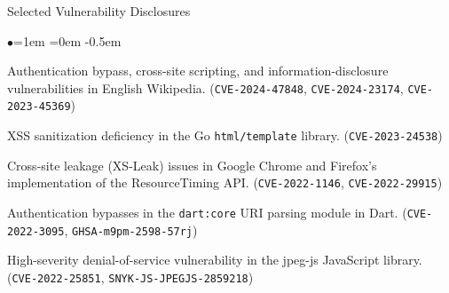 \documentclass{resume} %
\begin{document}
\begin{rSection}{Selected Vulnerability Disclosures}
\begin{list}{$\bullet$}{\leftmargin=1em \itemindent=0em}
\itemsep -0.5em
\item Authentication bypass, cross-site scripting, and information-disclosure vulnerabilities in English Wikipedia. (\texttt{CVE-2024-47848}, \texttt{CVE-2024-23174}, \texttt{CVE-2023-45369})
\item XSS sanitization deficiency in the Go \texttt{html/template} library. (\texttt{CVE-2023-24538})
\item Cross-site leakage (XS-Leak) issues in Google Chrome and Firefox's implementation of the ResourceTiming API. (\texttt{CVE-2022-1146}, \texttt{CVE-2022-29915})
\item Authentication bypasses in the \texttt{dart:core} URI parsing module in Dart. (\texttt{CVE-2022-3095}, \texttt{GHSA-m9pm-2598-57rj})
\item High-severity denial-of-service vulnerability in the jpeg-js JavaScript library. (\texttt{CVE-2022-25851}, \texttt{SNYK-JS-JPEGJS-2859218})
\end{list}
\end{rSection}
\end{document}
